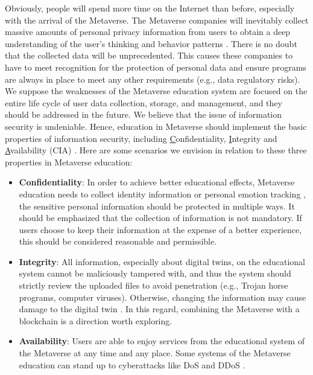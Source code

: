 \documentclass[conference]{IEEEtran}
\begin{document}
Obviously, people will spend more time on the Internet than before, especially with the arrival of the Metaverse. The Metaverse companies will inevitably collect massive amounts of personal privacy information from users to obtain a deep understanding of the user’s thinking and behavior patterns \cite{li2022frequent}. There is no doubt that the collected data will be unprecedented. This causes these companies to have to meet recognition for the protection of personal data and ensure programs are always in place to meet any other requirements (e.g., data regulatory risks). We suppose the weaknesses of the Metaverse education system are focused on the entire life cycle of user data collection, storage, and management, and they should be addressed in the future. We believe that the issue of information security is undeniable. Hence, education in Metaverse should implement the basic properties of information security, including \underline{C}onfidentiality, \underline{I}ntegrity and \underline{A}vailability (CIA) \cite{taherdoost2013definitions}. Here are some scenarios we envision in relation to these three properties in Metaverse education:

\begin{itemize}
    \item \textbf{Confidentiality}: In order to achieve better educational effects, Metaverse education needs to collect identity information or personal emotion tracking \cite{miller2020personal}, the sensitive personal information should be protected in multiple ways. It should be emphasized that the collection of information is not mandatory. If users choose to keep their information at the expense of a better experience, this should be considered reasonable and permissible.
    
    \item \textbf{Integrity}: All information, especially about digital twins, on the educational system cannot be maliciously tampered with, and thus the system should strictly review the uploaded files to avoid penetration (e.g., Trojan horse programs, computer viruses). Otherwise, changing the information may cause damage to the digital twin \cite{far2022applying}. In this regard, combining the Metaverse with a blockchain is a direction worth exploring.
    
    \item \textbf{Availability}: Users are able to enjoy services from the educational system of the Metaverse at any time and any place. Some systems of the Metaverse education can stand up to cyberattacks like DoS and DDoS \cite{umesh2022the, jonathan2022cybersecurity}. 
\end{itemize}
\end{document}
